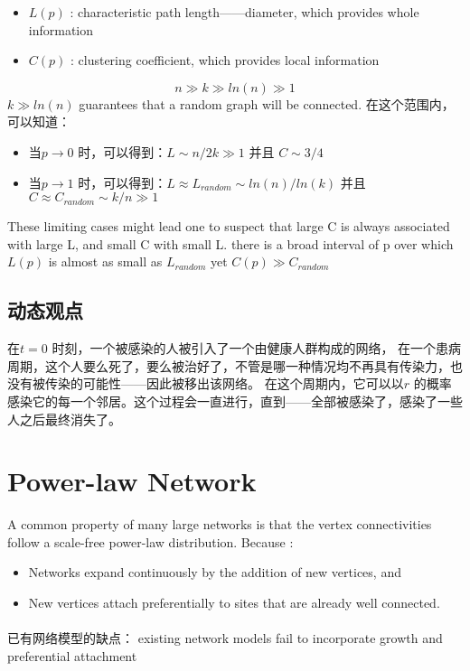 \documentclass[a4paper]{article}
\begin{document}
\begin{itemize}
	\item $L(p)$  :  characteristic path length——diameter, which provides whole information
	\item $C(p)$  :  clustering coefficient, which provides local information
\end{itemize}

\[n \gg k \gg ln(n) \gg 1\]
$k\gg ln(n)$  guarantees that a random graph will be connected.
在这个范围内，可以知道：
\begin{itemize}
	\item 当$p \rightarrow 0$ 时，可以得到：$L\sim n/2k \gg 1$  并且 $C\sim 3/4$
	\item  当$p \rightarrow 1$ 时，可以得到：$L\approx L_{random} \sim ln(n)/ln(k)$ 并且 $C\approx C_{random} \sim k/n \gg 1$
	
\end{itemize}

These limiting cases might lead one to suspect that large C is always associated with large L, and small C with small L.
there is a broad interval of p
over which $L(p)$  is almost as small as $L_{random}$ yet
$C(p) \gg C_{random}$
\subsection{动态观点}

在$t=0$ 时刻，一个被感染的人被引入了一个由健康人群构成的网络，
在一个患病周期，这个人要么死了，要么被治好了，不管是哪一种情况均不再具有传染力，也没有被传染的可能性——因此被移出该网络。
在这个周期内，它可以以$r$ 的概率感染它的每一个邻居。这个过程会一直进行，直到——全部被感染了，感染了一些人之后最终消失了。


\section{Power-law Network}
A common property of many large networks is that the vertex connectivities follow a scale-free power-law
distribution. Because :

\begin{itemize}
	\item Networks expand continuously by the addition of new vertices, and
	\item New vertices attach preferentially to sites that are already well connected.
\end{itemize}
\paragraph{}
已有网络模型的缺点：
existing network models fail to incorporate growth and preferential attachment
\end{document}
